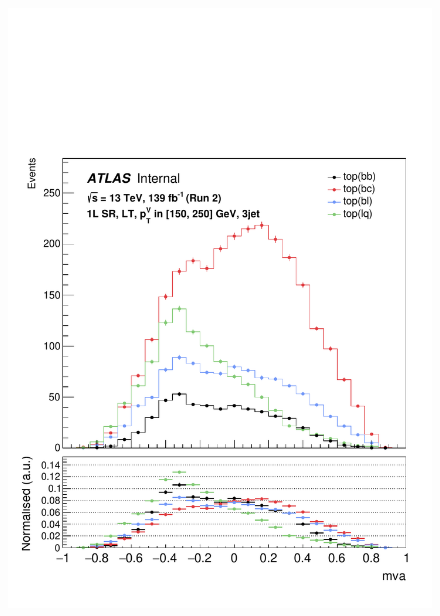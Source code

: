 \begin{figure}[h!]
\includegraphics[scale=0.253]{Images/VH/top/OneLepton_top_2lttag3jet_SR_150_250ptv_mva.pdf}

\end{figure}
